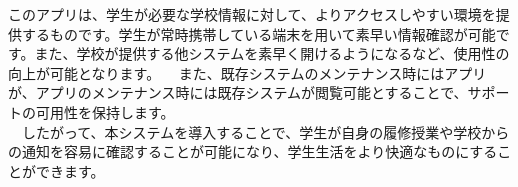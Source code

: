 このアプリは、学生が必要な学校情報に対して、よりアクセスしやすい環境を提供するものです。学生が常時携帯している端末を用いて素早い情報確認が可能です。また、学校が提供する他システムを素早く開けるようになるなど、使用性の向上が可能となります。
　また、既存システムのメンテナンス時にはアプリが、アプリのメンテナンス時には既存システムが閲覧可能とすることで、サポートの可用性を保持します。\\
　したがって、本システムを導入することで、学生が自身の履修授業や学校からの通知を容易に確認することが可能になり、学生生活をより快適なものにすることができます。\\
